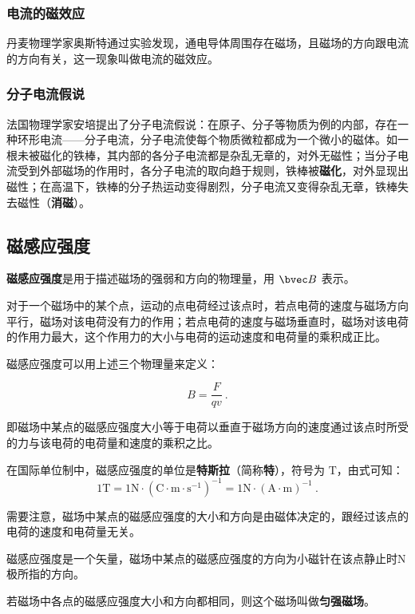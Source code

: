 \subsubsection{电流的磁效应}

丹麦物理学家奥斯特通过实验发现，通电导体周围存在磁场，且磁场的方向跟电流的方向有关，这一现象叫做电流的磁效应。

\subsubsection{分子电流假说}

法国物理学家安培提出了分子电流假说：在原子、分子等物质为例的内部，存在一种环形电流——分子电流，分子电流使每个物质微粒都成为一个微小的磁体。如一根未被磁化的铁棒，其内部的各分子电流都是杂乱无章的，对外无磁性；当分子电流受到外部磁场的作用时，各分子电流的取向趋于规则，铁棒被\textbf{磁化}，对外显现出磁性；在高温下，铁棒的分子热运动变得剧烈，分子电流又变得杂乱无章，铁棒失去磁性（\textbf{消磁}）。

\subsection{磁感应强度}

\textbf{磁感应强度}是用于描述磁场的强弱和方向的物理量，用 $\bvec B$ 表示。

对于一个磁场中的某个点，运动的点电荷经过该点时，若点电荷的速度与磁场方向平行，磁场对该电荷没有力的作用；若点电荷的速度与磁场垂直时，磁场对该电荷的作用力最大，这个作用力的大小与电荷的运动速度和电荷量的乘积成正比。

磁感应强度可以用上述三个物理量来定义：

\begin{equation}
B=\frac{F}{qv}~.
\end{equation}

即磁场中某点的磁感应强度大小等于电荷以垂直于磁场方向的速度通过该点时所受的力与该电荷的电荷量和速度的乘积之比。

在国际单位制中，磁感应强度的单位是\textbf{特斯拉}（简称\textbf{特}），符号为 $\mathrm{T}$，由式可知：
$$1\mathrm{T}=1\mathrm{N}\cdot ( \mathrm{C \cdot m \cdot s^{-1} } )^{-1}= 1 \mathrm{N} \cdot ( \mathrm{A} \cdot \mathrm{m})^{-1}~.$$

需要注意，磁场中某点的磁感应强度的大小和方向是由磁体决定的，跟经过该点的电荷的速度和电荷量无关。

磁感应强度是一个矢量，磁场中某点的磁感应强度的方向为小磁针在该点静止时$\mathrm{N}$极所指的方向。

若磁场中各点的磁感应强度大小和方向都相同，则这个磁场叫做\textbf{匀强磁场}。

